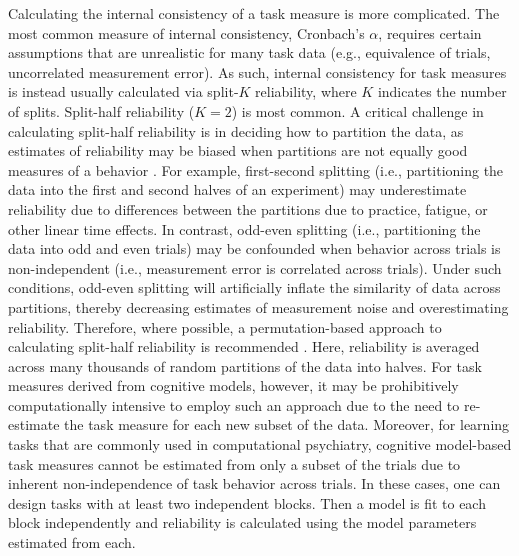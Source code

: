 \documentclass[a4paper,notitlepage,12pt]{article}
\begin{document}
Calculating the internal consistency of a task measure is more complicated. The most common measure of internal consistency, Cronbach's $\alpha$, requires certain assumptions that are unrealistic for many task data (e.g., equivalence of trials, uncorrelated measurement error). As such, internal consistency for task measures is instead usually calculated via split-$K$ reliability, where $K$ indicates the number of splits. Split-half reliability ($K=2$) is most common. A critical challenge in calculating split-half reliability is in deciding how to partition the data, as estimates of reliability may be biased when partitions are not equally good measures of a behavior \cite{Green2016-xw, pronk2022can}. For example, first-second splitting (i.e., partitioning the data into the first and second halves of an experiment) may underestimate reliability due to differences between the partitions due to practice, fatigue, or other linear time effects. In contrast, odd-even splitting (i.e., partitioning the data into odd and even trials) may be confounded when behavior across trials is non-independent (i.e., measurement error is correlated across trials). Under such conditions, odd-even splitting will artificially inflate the similarity of data across partitions, thereby decreasing estimates of measurement noise and overestimating reliability. Therefore, where possible, a permutation-based approach to calculating split-half reliability is recommended \cite{pronk2022can, Parsons2019-jw}. Here, reliability is averaged across many thousands of random partitions of the data into halves. For task measures derived from cognitive models, however, it may be prohibitively computationally intensive to employ such an approach due to the need to re-estimate the task measure for each new subset of the data. Moreover, for learning tasks that are commonly used in computational psychiatry, cognitive model-based task measures cannot be estimated from only a subset of the trials due to inherent non-independence of task behavior across trials. In these cases, one can design tasks with at least two independent blocks. Then a model is fit to each block independently and reliability is calculated using the model parameters estimated from each. 
\end{document}
